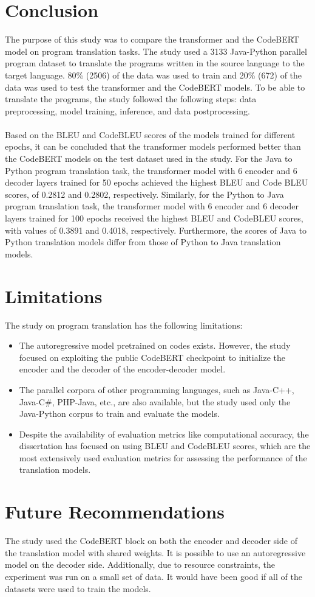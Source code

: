 \section{Conclusion}
The purpose of this study was to compare the transformer and the CodeBERT model on program translation tasks. The study used a 3133 Java-Python parallel program dataset to translate the programs written in the source language to the target language. 80\% (2506) of the data was used to train and 20\% (672) of the data was used to test the transformer and the CodeBERT models. To be able to translate the programs, the study followed the following steps: data preprocessing, model training, inference, and data postprocessing.
\\\\
Based on the BLEU and CodeBLEU scores of the models trained for different epochs, it can be concluded that the transformer models performed better than the CodeBERT models on the test dataset used in the study. For the Java to Python program translation task, the transformer model with 6 encoder and 6 decoder layers trained for 50 epochs achieved the highest BLEU and Code BLEU scores, of 0.2812 and 0.2802, respectively. Similarly, for the Python to Java program translation task, the transformer model with 6 encoder and 6 decoder layers trained for 100 epochs received the highest BLEU and CodeBLEU scores, with values of 0.3891 and 0.4018, respectively. Furthermore, the scores of Java to Python translation models differ from those of Python to Java translation models.

\section{Limitations}
The study on program translation has the following limitations:
\begin{itemize}[nosep]
\item The autoregressive model pretrained on codes exists. However, the study focused on exploiting the public CodeBERT checkpoint to initialize the encoder and the decoder of the encoder-decoder model.
\item The parallel corpora of other programming languages, such as Java-C++, Java-C\#, PHP-Java, etc., are also available, but the study used only the Java-Python corpus to train and evaluate the models.
\item Despite the availability of evaluation metrics like computational accuracy, the dissertation has focused on using BLEU and CodeBLEU scores, which are the most extensively used evaluation metrics for assessing the performance of the translation models.
\end{itemize}

\section{Future Recommendations}
The study used the CodeBERT block on both the encoder and decoder side of the translation model with shared weights. It is possible to use an autoregressive model on the decoder side. Additionally, due to resource constraints, the experiment was run on a small set of data. It would have been good if all of the datasets were used to train the models.